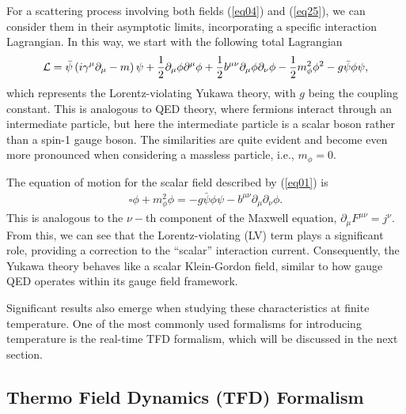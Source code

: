 \documentclass[11pt,showpacs,preprintnumbers,amsmath,amssymb,prd,nofootinbib,superscriptaddress]{revtex4-2}
\begin{document}
For a scattering process involving both fields (\ref{eq04}) and (\ref{eq25}), we can consider them in their asymptotic limits, incorporating a specific interaction Lagrangian. In this way, we start with the following total Lagrangian
\begin{eqnarray}
\label{1}
    \mathcal{L}=\Bar{\psi}\left(i\gamma^\mu\partial_\mu-m\right)\psi+\frac{1}{2}\partial_\mu\phi\partial^\mu\phi +\frac{1}{2}b^{\mu\nu}\partial_\mu\phi\partial_\nu\phi -\frac{1}{2}m_\phi^2\phi^2-g\Bar{\psi}\phi\psi,\label{eq01}
\end{eqnarray}
which represents the Lorentz-violating Yukawa theory, with $g$ being the coupling constant. This is analogous to QED theory, where fermions interact through an intermediate particle, but here the intermediate particle is a scalar boson rather than a spin-1 gauge boson. The similarities are quite evident and become even more pronounced when considering a massless particle, i.e., $m_\phi=0$. 

The equation of motion for the scalar field described by (\ref{eq01}) is
\begin{eqnarray}
    \square\phi+m_{\phi}^2\phi=-g\bar{\psi}\phi\psi-b^{\mu\nu}\partial_\mu\partial_\nu\phi.
\end{eqnarray}
This is analogous to the $\nu-$th component of the Maxwell equation, $\partial_\mu F^{\mu\nu}=j^\nu$. From this, we can see that the Lorentz-violating (LV) term plays a significant role, providing a correction to the ``scalar'' interaction current. Consequently, the Yukawa theory behaves like a scalar Klein-Gordon field, similar to how gauge QED operates within its gauge field framework.

Significant results also emerge when studying these characteristics at finite temperature. One of the most commonly used formalisms for introducing temperature is the real-time TFD formalism, which will be discussed in the next section.


\subsection{Thermo Field Dynamics (TFD) Formalism}\label{sectfd}
\end{document}
